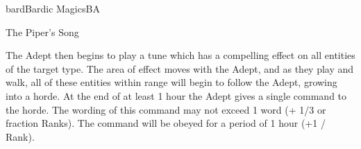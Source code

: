 \begin{College}[2.1]{bard}{Bardic Magics}{BA}
\begin{ritual}[R-4]{The Piper’s Song}
\begin{effects}
The Adept then begins to play a tune which has a compelling effect on
all entities of the target type. The area of effect moves with the
Adept, and as they play and walk, all of these entities within range
will begin to follow the Adept, growing into a horde.  At the end of
at least 1 hour the Adept gives a single command to the horde.  The
wording of this command may not exceed 1 word (+ 1/3 or fraction
Ranks).  The command will be obeyed for a period of 1 hour (+1 /
Rank).
\end{effects}
\end{ritual}

\end{College}
